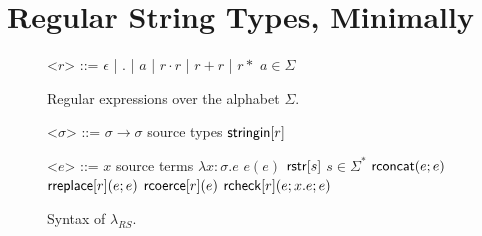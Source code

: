 \documentclass[9pt]{sig-alternate}
\theoremstyle{definition}
\newcommand{\sisubst}[3]{{\sf rreplace}[#1](#2;#3)} \newcommand{\rreplace}[3]{{\sf rreplace}[#1](#2;#3)} %
\newcommand{\rcoerce}[2]{{\sf rcoerce}[#1](#2)}
\newcommand{\sistr}[1]{{\sf rstr}[#1]}   \newcommand{\rstr}[1]{{\sf rstr}[#1]} %
\newcommand{\rcheck}[4]{ {\sf rcheck}[#1](#2;#3;#4) }
\newcommand{\strin}[1]{\sistr{#1}}
\newcommand{\rsconcat}[2]{{\sf rconcat}(#1;#2)} \newcommand{\rconcat}[2]{{\sf rconcat}(#1;#2)} %
\newcommand{\stringin}[1]{{\sf stringin}[#1]}
\begin{document}
\section{Regular String Types, Minimally}\label{calculus}
\renewcommand{\grammarlabel}[2]{#1\hfill#2}

\begin{figure}[t]
\begin{grammar}
<$r$> ::= $\epsilon$ | $.$ | $a$ | $r \cdot r$ | $r + r$ | $r*$ \hfill $a \in \Sigma$

\caption{Regular expressions over the alphabet $\Sigma$.}
\label{fig:regex}
\end{grammar}
\end{figure}

\begin{figure}[t]
\begin{grammar}

<$\sigma$> ::=  $\sigma \rightarrow \sigma$     \hfill  source types          \alt
$\stringin{r}$         

<$e$> ::= 
      $x$ \hfill source terms \alt 
      $\lambda x {:} \sigma . e$ \alt
      $e(e)$ \alt
      $\strin{s}$ \hfill $s \in \Sigma^{*}$ \alt
      $\rsconcat{e}{e}$ \alt
      $\sisubst{r}{e}{e}$ \alt
      $\rcoerce{r}{e}$ \alt
      $\rcheck{r}{e}{x.e}{e}$
\caption{Syntax of $\lambda_{RS}$.}\label{fig:lamrs}
\end{grammar}
\end{figure}


\newcommand{\sctx}{\Psi} %
\newcommand{\tctx}{\Theta} %

\newcommand{\ereduces}{\Downarrow}
\end{document}
